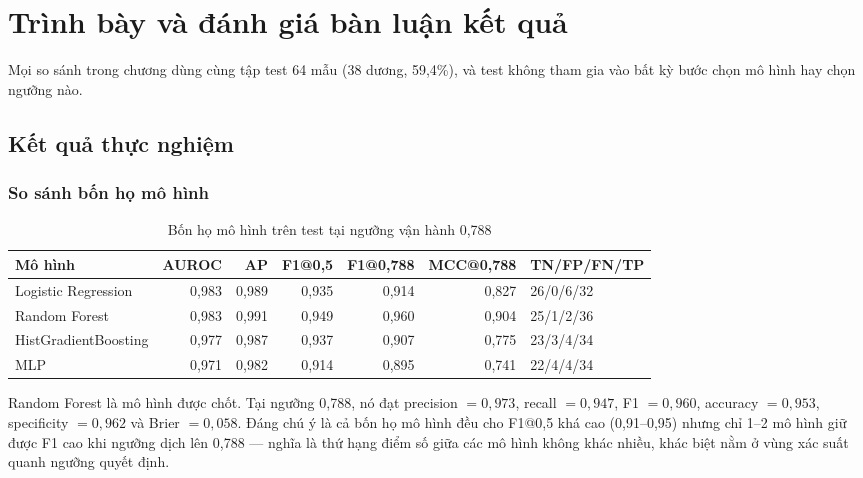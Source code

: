 \chapter{Trình bày và đánh giá bàn luận kết quả}

Mọi so sánh trong chương dùng cùng tập test 64 mẫu (38 dương, 59,4\%), và test không tham gia vào
bất kỳ bước chọn mô hình hay chọn ngưỡng nào.

\section{Kết quả thực nghiệm}

\subsection{So sánh bốn họ mô hình}

\begin{table}[H]
\centering
\caption{Bốn họ mô hình trên test tại ngưỡng vận hành 0,788}
\label{tab:four_models}
\begin{tabular}{|l|r|r|r|r|r|l|}
\hline
\textbf{Mô hình} & \textbf{AUROC} & \textbf{AP} & \textbf{F1@0,5} & \textbf{F1@0,788} &
\textbf{MCC@0,788} & \textbf{TN/FP/FN/TP} \\
\hline
Logistic Regression  & 0,983 & 0,989 & 0,935 & 0,914 & 0,827 & 26/0/6/32 \\
Random Forest        & 0,983 & 0,991 & 0,949 & 0,960 & 0,904 & 25/1/2/36 \\
HistGradientBoosting & 0,977 & 0,987 & 0,937 & 0,907 & 0,775 & 23/3/4/34 \\
MLP                  & 0,971 & 0,982 & 0,914 & 0,895 & 0,741 & 22/4/4/34 \\
\hline
\end{tabular}
\end{table}

Random Forest là mô hình được chốt. Tại ngưỡng 0,788, nó đạt precision $= 0{,}973$,
recall $= 0{,}947$, F1 $= 0{,}960$, accuracy $= 0{,}953$, specificity $= 0{,}962$ và Brier
$= 0{,}058$. Đáng chú ý là cả bốn họ mô hình đều cho F1@0,5 khá cao (0,91--0,95) nhưng chỉ 1--2 mô
hình giữ được F1 cao khi ngưỡng dịch lên 0,788 — nghĩa là thứ hạng điểm số giữa các mô hình không
khác nhiều, khác biệt nằm ở vùng xác suất quanh ngưỡng quyết định.

